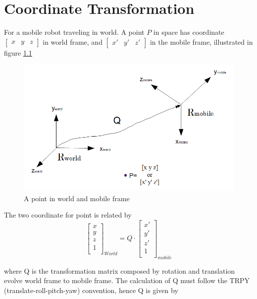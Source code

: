 \chapter{Coordinate Transformation}\label{ch:appendix1}

For a mobile robot traveling in world. A point $P$ in space has
coordinate $[\begin{matrix}x & y & z\end{matrix}]$ in world frame, and
$[\begin{matrix}x' & y' & z' \end{matrix}]$ in the mobile frame,
illustrated in figure \ref{fig:appx1-1}

\begin{figure}[h]
\centering
\includegraphics[width=12cm, keepaspectratio=true]{./Figures/coordinate_transformation/coordinate_transformation.png}
\caption{A point in world and mobile frame}
\label{fig:appx1-1}
\end{figure}

The two coordinate for point is related by
\begin{equation}
\begin{bmatrix}
x \\ y \\ z \\ 1 \\
\end{bmatrix}_{World}=Q\cdot\begin{bmatrix}
x' \\ y' \\ z' \\ 1  \\
\end{bmatrix}_{mobile}
\end{equation}

\noindent where Q is the transformation matrix composed by rotation
and translation evolve world frame to mobile frame. The calculation of
Q must follow the TRPY (translate-roll-pitch-yaw) convention, hence Q
is given by

